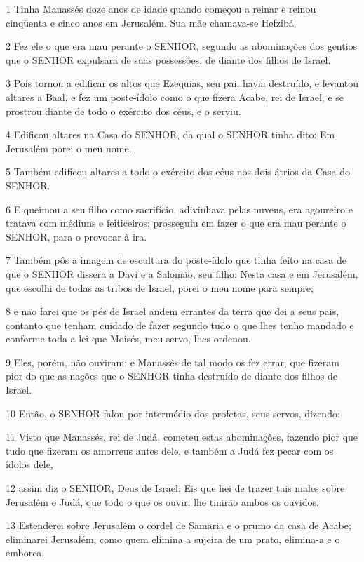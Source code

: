 \par 1 Tinha Manassés doze anos de idade quando começou a reinar e reinou cinqüenta e cinco anos em Jerusalém. Sua mãe chamava-se Hefzibá.
\par 2 Fez ele o que era mau perante o SENHOR, segundo as abominações dos gentios que o SENHOR expulsara de suas possessões, de diante dos filhos de Israel.
\par 3 Pois tornou a edificar os altos que Ezequias, seu pai, havia destruído, e levantou altares a Baal, e fez um poste-ídolo como o que fizera Acabe, rei de Israel, e se prostrou diante de todo o exército dos céus, e o serviu.
\par 4 Edificou altares na Casa do SENHOR, da qual o SENHOR tinha dito: Em Jerusalém porei o meu nome.
\par 5 Também edificou altares a todo o exército dos céus nos dois átrios da Casa do SENHOR.
\par 6 E queimou a seu filho como sacrifício, adivinhava pelas nuvens, era agoureiro e tratava com médiuns e feiticeiros; prosseguiu em fazer o que era mau perante o SENHOR, para o provocar à ira.
\par 7 Também pôs a imagem de escultura do poste-ídolo que tinha feito na casa de que o SENHOR dissera a Davi e a Salomão, seu filho: Nesta casa e em Jerusalém, que escolhi de todas as tribos de Israel, porei o meu nome para sempre;
\par 8 e não farei que os pés de Israel andem errantes da terra que dei a seus pais, contanto que tenham cuidado de fazer segundo tudo o que lhes tenho mandado e conforme toda a lei que Moisés, meu servo, lhes ordenou.
\par 9 Eles, porém, não ouviram; e Manassés de tal modo os fez errar, que fizeram pior do que as nações que o SENHOR tinha destruído de diante dos filhos de Israel.
\par 10 Então, o SENHOR falou por intermédio dos profetas, seus servos, dizendo:
\par 11 Visto que Manassés, rei de Judá, cometeu estas abominações, fazendo pior que tudo que fizeram os amorreus antes dele, e também a Judá fez pecar com os ídolos dele,
\par 12 assim diz o SENHOR, Deus de Israel: Eis que hei de trazer tais males sobre Jerusalém e Judá, que todo o que os ouvir, lhe tinirão ambos os ouvidos.
\par 13 Estenderei sobre Jerusalém o cordel de Samaria e o prumo da casa de Acabe; eliminarei Jerusalém, como quem elimina a sujeira de um prato, elimina-a e o emborca.
